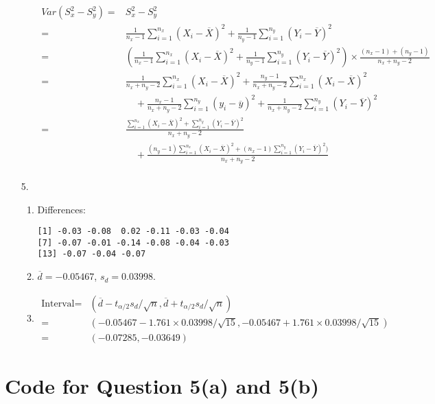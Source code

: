 \documentclass{article}
\begin{document}
\begin{enumerate}
\begin{itemize}
        \begin{equation*}
        \begin{aligned}
            Var(S_x^2 - S_y^2) =& S_x^2 - S_y^2 \\
                =& \frac{1}{n_x - 1} \sum_{i = 1}^{n_x} (X_i - \overbar{X})^2 + \frac{1}{n_y - 1} \sum_{i = 1}^{n_y} (Y_i - \overbar{Y})^2 \\
                =& (\frac{1}{n_x - 1} \sum_{i = 1}^{n_x} (X_i - \overbar{X})^2
                    + \frac{1}{n_y - 1} \sum_{i = 1}^{n_y} (Y_i - \overbar{Y})^2)
                    \times \frac{(n_x - 1) + (n_y - 1)}{n_x + n_y - 2} \\
                =& \frac{1}{n_x + n_y - 2} \sum_{i = 1}^{n_x} (X_i - \overbar{X})^2
                    + \frac{n_y - 1}{n_x + n_y - 2} \sum_{i = 1}^{n_x} (X_i - \overbar{X})^2 \\
                &\quad + \frac{n_x - 1}{n_x + n_y - 2} \sum_{i = 1}^{n_y} (y_i - \overbar{y})^2
                    + \frac{1}{n_x + n_y - 2} \sum_{i = 1}^{n_y} (Y_i - \overbar{Y})^2 \\
                =& \frac{\sum_{i = 1}^{n_x} (X_i - \overbar{X})^2 +  \sum_{i = 1}^{n_y} (Y_i - \overbar{Y})^2}{n_x + n_y - 2} \\
                &\quad + \frac{(n_y - 1)\sum_{i = 1}^{n_x} (X_i - \overbar{X})^2 + (n_x - 1) \sum_{i = 1}^{n_y} (Y_i - \overbar{Y})^2)}{n_x + n_y - 2}\\
        \end{aligned}
        \end{equation*}
    \end{itemize}
\item [5.]
    \begin{enumerate}
    \item Differences: \\
        \begin{lstlisting}
[1] -0.03 -0.08  0.02 -0.11 -0.03 -0.04
[7] -0.07 -0.01 -0.14 -0.08 -0.04 -0.03
[13] -0.07 -0.04 -0.07
        \end{lstlisting}
    \item $\overbar{d} = -0.05467$, $s_d = 0.03998$.
    \item
        \begin{equation*}
        \begin{aligned}
        \text{Interval} =& (\overbar{d} - t_{\alpha / 2} s_d / \sqrt n, \overbar{d} + t_{\alpha / 2} s_d / \sqrt n) \\
            =& (-0.05467 - 1.761 \times 0.03998 / \sqrt{15}, -0.05467 + 1.761 \times 0.03998 / \sqrt{15}) \\
            =& (-0.07285, -0.03649)
        \end{aligned}
        \end{equation*}
    \end{enumerate}
\end{enumerate}


\newpage
\appendix
\section{Code for Question 5(a) and 5(b)}

\end{document}
